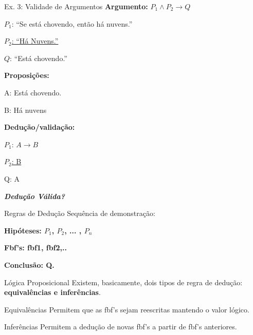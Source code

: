\documentclass[aspectratio=169]{beamer}
\begin{document}
\begin{frame}{Ex. 3: Validade de Argumentos}
    \textbf{Argumento:} $P_1 \wedge P_2 \rightarrow Q$

    $P_1$: ``Se está chovendo, então há nuvens.''

    \underline{$P_2$: ``Há Nuvens.''}

    $Q$: ``Está chovendo.''

    \vspace{3mm}
    \textbf{Proposições:}

    A: Está chovendo.

    B: Há nuvens
    \vspace{3mm}

    \textbf{Dedução/validação:}

    $P_1$: $A \rightarrow B$

    \underline{$P_2$: B}

    Q: A
    \vspace{4mm}

    \textit{\textbf{Dedução Válida?}}


\end{frame}

\begin{frame}{Regras de Dedução}
    Sequência de demonstração:
    \vspace*{4mm}

    \textbf{Hipóteses: $P_1$, $P_2$, ... , $P_n$}
    \vspace*{2mm}

    \textbf{Fbf's: fbf1, fbf2,..}
    \vspace*{2mm}

    \textbf{Conclusão: Q.}

\end{frame}

\begin{frame}{Lógica Proposicional}
    Existem, basicamente, dois tipos de regra de dedução: \textbf{equivalências e inferências}.
    \vspace*{4mm}

    \begin{block}{Equivalências}
        Permitem que as fbf's sejam reescritas mantendo o valor lógico.
    \end{block}

    \vspace*{4mm}

    \begin{block}{Inferências}
        Permitem a dedução de novas fbf's a partir de fbf's anteriores.
    \end{block}


\end{frame}
\end{document}
